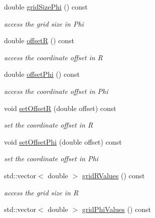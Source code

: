 \begin{DoxyCompactItemize}
double \hyperlink{class_d_d4hep_1_1_geometry_1_1_polar_grid_r_phi2_aa57577ab57e185dbee6c82b084bee2e4}{gridSizePhi} () const 
\begin{DoxyCompactList}\small\item\em access the grid size in Phi \item\end{DoxyCompactList}\item 
double \hyperlink{class_d_d4hep_1_1_geometry_1_1_polar_grid_r_phi2_a06d0e8a37a14fa5ac7befaa5d42e0999}{offsetR} () const 
\begin{DoxyCompactList}\small\item\em access the coordinate offset in R \item\end{DoxyCompactList}\item 
double \hyperlink{class_d_d4hep_1_1_geometry_1_1_polar_grid_r_phi2_ad7c97a5a97fad06114de10cf6d1946e7}{offsetPhi} () const 
\begin{DoxyCompactList}\small\item\em access the coordinate offset in Phi \item\end{DoxyCompactList}\item 
void \hyperlink{class_d_d4hep_1_1_geometry_1_1_polar_grid_r_phi2_a38a159e048f10cae3ed2175abc02faec}{setOffsetR} (double offset) const 
\begin{DoxyCompactList}\small\item\em set the coordinate offset in R \item\end{DoxyCompactList}\item 
void \hyperlink{class_d_d4hep_1_1_geometry_1_1_polar_grid_r_phi2_a61ceeca1d68f2aa8e58054de24e3e1b1}{setOffsetPhi} (double offset) const 
\begin{DoxyCompactList}\small\item\em set the coordinate offset in Phi \item\end{DoxyCompactList}\item 
std::vector$<$ double $>$ \hyperlink{class_d_d4hep_1_1_geometry_1_1_polar_grid_r_phi2_a3231c3be63d9f2c5acc498e99a8b29d9}{gridRValues} () const 
\begin{DoxyCompactList}\small\item\em access the grid size in R \item\end{DoxyCompactList}\item 
std::vector$<$ double $>$ \hyperlink{class_d_d4hep_1_1_geometry_1_1_polar_grid_r_phi2_ab4ef99171afc6b7e6b603c11b3b3cc19}{gridPhiValues} () const 

\end{DoxyCompactItemize}

